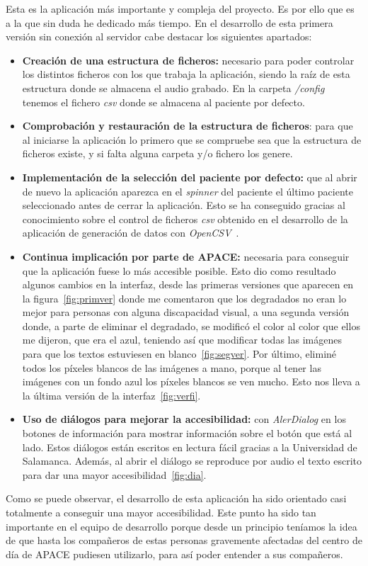 Esta es la aplicación más importante y compleja del proyecto. Es por ello que es a la que sin duda he dedicado más tiempo. En el desarrollo de esta primera versión sin conexión al servidor cabe destacar los siguientes apartados:
\begin{itemize}
	\item \textbf{Creación de una estructura de ficheros:} necesario para poder controlar los distintos ficheros con los que trabaja la aplicación, siendo la raíz de esta estructura donde se almacena el audio grabado. En la carpeta \textit{/config} tenemos el fichero \textit{csv} donde se almacena al paciente por defecto.
	\item \textbf{Comprobación y restauración de la estructura de ficheros}: para que al iniciarse la aplicación lo primero que se compruebe sea que la estructura de ficheros existe, y si falta alguna carpeta y/o fichero los genere.
	\item \textbf{Implementación de la selección del paciente por defecto:} que al abrir de nuevo la aplicación aparezca en el \textit{spinner} del paciente el último paciente seleccionado antes de cerrar la aplicación. Esto se ha conseguido gracias al conocimiento sobre el control de ficheros \textit{csv} obtenido en el desarrollo de la aplicación de generación de datos con \textit{OpenCSV}~\cite{opencsv}.
	\item \textbf{Continua implicación por parte de APACE:} necesaria para conseguir que la aplicación fuese lo más accesible posible. Esto dio como resultado algunos cambios en la interfaz, desde las primeras versiones que aparecen en la figura~\ref{fig:primver} donde me comentaron que los degradados no eran lo mejor para personas con alguna discapacidad visual, a una segunda versión donde, a parte de eliminar el degradado, se modificó el color al color que ellos me dijeron, que era el azul, teniendo así que modificar todas las imágenes para que los textos estuviesen en blanco~\ref{fig:segver}. Por último, eliminé todos los píxeles blancos de las imágenes a mano, porque al tener las imágenes con un fondo azul los píxeles blancos se ven mucho. Esto nos lleva a la última versión de la interfaz~\ref{fig:verfi}.
	\item \textbf{Uso de diálogos para mejorar la accesibilidad:} con \textit{AlerDialog} en los botones de información para mostrar información sobre el botón que está al lado. Estos diálogos están escritos en lectura fácil gracias a la Universidad de Salamanca. Además, al abrir el diálogo se reproduce por audio el texto escrito para dar una mayor accesibilidad~\ref{fig:dia}.
\end{itemize}
Como se puede observar, el desarrollo de esta aplicación ha sido orientado casi totalmente a conseguir una mayor accesibilidad. Este punto ha sido tan importante en el equipo de desarrollo porque desde un principio teníamos la idea de que hasta los compañeros de estas personas gravemente afectadas del centro de día de APACE pudiesen utilizarlo, para así poder entender a sus compañeros.

